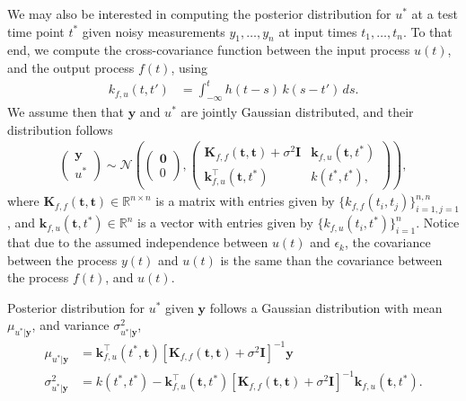 \documentclass[journal]{IEEEtran}
\begin{document}
We may also be interested in computing the posterior distribution for $u^*$ at a test time point $t^*$ given noisy
measurements $y_1, \ldots, y_n$ at input times $t_1, \ldots, t_n$. To that end, we compute the cross-covariance function
between the input process $u(t)$, and the output process $f(t)$, using
\begin{align}
k_{f,u}(t,t') & = \int_{-\infty}^t h(t-s)\, k(s - t')\, ds.
\label{eq:fucov}
\end{align}
We assume then that $\mathbf{y}$ and $u^*$ are jointly Gaussian distributed, and their distribution follows
\begin{align*}
\begin{pmatrix}
\mathbf{y}\\
u^*
\end{pmatrix}\sim
\mathcal{N}
\left(
\begin{pmatrix}
\mathbf{0}\\
0
\end{pmatrix},
\begin{pmatrix}
\mathbf{K}_{f,f}(\mathbf{t}, \mathbf{t}) + \sigma^2\mathbf{I} & \mathbf{k}_{f,u}(\mathbf{t}, t^*)\\
\mathbf{k}_{f,u}^{\top}(\mathbf{t}, t^*) & k(t^*, t^*),
\end{pmatrix}
\right),
\end{align*}
where $\mathbf{K}_{f,f}(\mathbf{t}, \mathbf{t})\in\mathbb{R}^{n\times n}$ is a matrix with entries given by
$\{k_{f,f}(t_i, t_j)\}_{i=1, j=1}^{n,n}$, and $\mathbf{k}_{f,u}(\mathbf{t}, t^*) \in\mathbb{R}^{n}$ is a vector with entries
given by $\{k_{f,u}(t_i, t^*)\}_{i=1}^{n}$. Notice that due to the assumed independence between $u(t)$ and $\epsilon_k$,
the covariance between the process $y(t)$ and $u(t)$ is the same than the covariance between the process $f(t)$, and
$u(t)$.

Posterior distribution for $u^*$ given $\mathbf{y}$ follows a Gaussian distribution with mean $\mu_{u^*|\mathbf{y}}$, and
variance $\sigma^2_{u^*|\mathbf{y}}$,
\begin{align*}
\mu_{u^*|\mathbf{y}} & = \mathbf{k}_{f,u}^{\top}(t^*, \mathbf{t})\left[\mathbf{K}_{f,f}(\mathbf{t}, \mathbf{t})
+ \sigma^2\mathbf{I}\right]^{-1}\mathbf{y}\\
\sigma^2_{u^*|\mathbf{y}} & =  k(t^*, t^*) - \mathbf{k}_{f,u}^{\top}(\mathbf{t}, t^*)\left[\mathbf{K}_{f,f}(\mathbf{t}, \mathbf{t})
+ \sigma^2\mathbf{I}\right]^{-1}\mathbf{k}_{f,u}(\mathbf{t}, t^*).
\end{align*}
\end{document}

